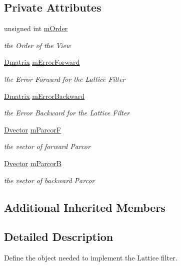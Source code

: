 \subsection*{Private Attributes}
\begin{DoxyCompactItemize}
\item 
unsigned int \hyperlink{classtsa_1_1_lattice_view_acb69a220044c95ee2b32d90ce4ee2f7c}{m\+Order}
\begin{DoxyCompactList}\small\item\em the Order of the View \end{DoxyCompactList}\item 
\hyperlink{namespacetsa_ad260cd21c1891c4ed391fe788569aba4}{Dmatrix} \hyperlink{classtsa_1_1_lattice_view_ac7976d0ac256453229dec51c14da0c26}{m\+Error\+Forward}
\begin{DoxyCompactList}\small\item\em the Error Forward for the Lattice Filter \end{DoxyCompactList}\item 
\hyperlink{namespacetsa_ad260cd21c1891c4ed391fe788569aba4}{Dmatrix} \hyperlink{classtsa_1_1_lattice_view_a9bbdb82e6aee17385ed9cd45da26c6ea}{m\+Error\+Backward}
\begin{DoxyCompactList}\small\item\em the Error Backward for the Lattice Filter \end{DoxyCompactList}\item 
\hyperlink{namespacetsa_a8900fb03d849baf447a1a0efe2561fb2}{Dvector} \hyperlink{classtsa_1_1_lattice_view_a3fbd93734d9b37488687840609c93e7a}{m\+ParcorF}
\begin{DoxyCompactList}\small\item\em the vector of forward Parcor \end{DoxyCompactList}\item 
\hyperlink{namespacetsa_a8900fb03d849baf447a1a0efe2561fb2}{Dvector} \hyperlink{classtsa_1_1_lattice_view_a07aba04a75f98622d97ef4baac7a95e6}{m\+ParcorB}
\begin{DoxyCompactList}\small\item\em the vector of backward Parcor \end{DoxyCompactList}\end{DoxyCompactItemize}
\subsection*{Additional Inherited Members}


\subsection{Detailed Description}
Define the object needed to implement the Lattice filter. 

